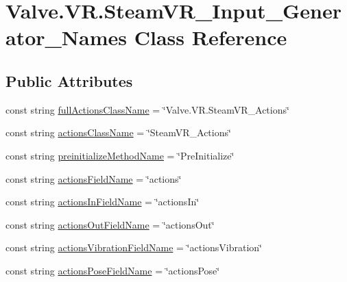 \hypertarget{class_valve_1_1_v_r_1_1_steam_v_r___input___generator___names}{}\section{Valve.\+V\+R.\+Steam\+V\+R\+\_\+\+Input\+\_\+\+Generator\+\_\+\+Names Class Reference}
\label{class_valve_1_1_v_r_1_1_steam_v_r___input___generator___names}
\subsection*{Public Attributes}
\begin{DoxyCompactItemize}
\item 
const string \mbox{\hyperlink{class_valve_1_1_v_r_1_1_steam_v_r___input___generator___names_aa844f01f224d95520fb08ce1c2294bc7}{full\+Actions\+Class\+Name}} = \char`\"{}Valve.\+V\+R.\+Steam\+V\+R\+\_\+\+Actions\char`\"{}
\item 
const string \mbox{\hyperlink{class_valve_1_1_v_r_1_1_steam_v_r___input___generator___names_a64c7fbc8f7b1a3402a05c17bd3d013e5}{actions\+Class\+Name}} = \char`\"{}Steam\+V\+R\+\_\+\+Actions\char`\"{}
\item 
const string \mbox{\hyperlink{class_valve_1_1_v_r_1_1_steam_v_r___input___generator___names_a9e57ccfc184344787e0cba54a7985bea}{preinitialize\+Method\+Name}} = \char`\"{}Pre\+Initialize\char`\"{}
\item 
const string \mbox{\hyperlink{class_valve_1_1_v_r_1_1_steam_v_r___input___generator___names_af18299eb08aea8898541233c025bc903}{actions\+Field\+Name}} = \char`\"{}actions\char`\"{}
\item 
const string \mbox{\hyperlink{class_valve_1_1_v_r_1_1_steam_v_r___input___generator___names_acdf8f8c97225f0e0cd52a3fa690d45af}{actions\+In\+Field\+Name}} = \char`\"{}actions\+In\char`\"{}
\item 
const string \mbox{\hyperlink{class_valve_1_1_v_r_1_1_steam_v_r___input___generator___names_a58d75553f5715c6c5ea1bb8ce81a8966}{actions\+Out\+Field\+Name}} = \char`\"{}actions\+Out\char`\"{}
\item 
const string \mbox{\hyperlink{class_valve_1_1_v_r_1_1_steam_v_r___input___generator___names_a34121fee6c631ce456f5480697f3db85}{actions\+Vibration\+Field\+Name}} = \char`\"{}actions\+Vibration\char`\"{}
\item 
const string \mbox{\hyperlink{class_valve_1_1_v_r_1_1_steam_v_r___input___generator___names_abfeeab00b38a1f55a07f989b7398f2be}{actions\+Pose\+Field\+Name}} = \char`\"{}actions\+Pose\char`\"{}

\end{DoxyCompactItemize}
